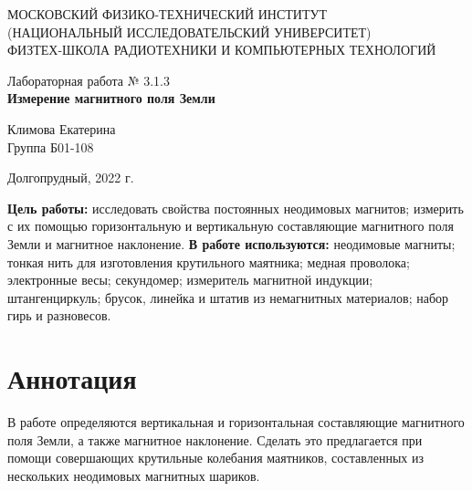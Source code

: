 \documentclass[a4paper,12pt]{article} %
\begin{document}
\begin{center}
	\footnotesize{МОСКОВСКИЙ ФИЗИКО-ТЕХНИЧЕСКИЙ ИНСТИТУТ\\(НАЦИОНАЛЬНЫЙ 			ИССЛЕДОВАТЕЛЬСКИЙ УНИВЕРСИТЕТ)}\\
	\footnotesize{ФИЗТЕХ-ШКОЛА РАДИОТЕХНИКИ И КОМПЬЮТЕРНЫХ ТЕХНОЛОГИЙ\\}
	\hfill \break
	\hfill \break
	\hfill \break
	\hfill \break
	\hfill \break
	\hfill \break
\end{center}

\begin{center}   
    \hfill \break
	\hfill \break
	\hfill \break
	\hfill \break
	\hfill \break
	\hfill \break
	\hfill \break
	\hfill \break
	\hfill \break
	\hfill \break
	\hfill \break
	\large{Лабораторная работа № 3.1.3\\\large{\textbf{Измерение магнитного поля Земли}}}\\
	\hfill \break
	\hfill \break
	\hfill \break
	\hfill \break
	\hfill \break
	\hfill \break
	\hfill \break
	\hfill \break
	\hfill \break
	\hfill \break
	\hfill \break
	\begin{flushright}
		Климова Екатерина\\
		Группа Б01-108
	\end{flushright}
	\hfill \break
\end{center}
\hfill \break
\hfill \break
\begin{center}
	Долгопрудный, 2022 г.
\end{center}
\thispagestyle{empty}

\newpage
\hfill \break
\textbf{Цель работы:} исследовать свойства постоянных неодимовых магнитов; измерить с их помощью горизонтальную и вертикальную составляющие магнитного поля Земли и магнитное наклонение.
\hfill \break
\hfill \break
\textbf{В работе используются:} неодимовые магниты; тонкая нить для изготовления крутильного маятника; медная проволока; электронные весы; секундомер; измеритель магнитной индукции; штангенциркуль; брусок, линейка и штатив из немагнитных материалов; набор гирь и разновесов.

\section{Аннотация}
\hfill \break
В работе определяются вертикальная и горизонтальная составляющие магнитного поля Земли, а также магнитное наклонение. Сделать это предлагается при помощи совершающих крутильные колебания маятников, составленных из нескольких неодимовых магнитных шариков.
\end{document}
